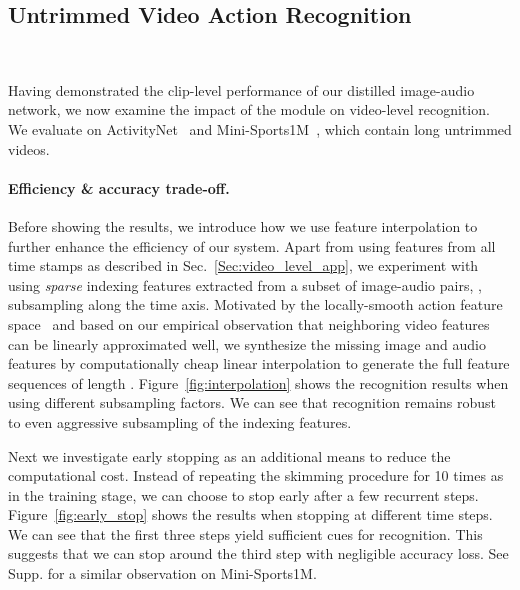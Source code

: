 \vspace{-0.05in}
\subsection{Untrimmed Video Action Recognition}~\label{Sec:video_level_results}
\vspace{-0.2in}

Having demonstrated the clip-level performance of our distilled image-audio network, we now examine the impact of the  module on video-level recognition. We evaluate on ActivityNet~\cite{caba2015activitynet} and Mini-Sports1M~\cite{karpathy2014large}, which contain long untrimmed videos. 

\vspace{-0.05in}
\paragraph{Efficiency \& accuracy trade-off.} 
Before showing the results, we introduce how we use feature interpolation to further enhance the efficiency of our system. Apart from using features from all  time stamps as described in Sec.~\ref{Sec:video_level_app}, we experiment with using \emph{sparse} indexing features extracted from a subset of image-audio pairs, \ie, subsampling along the time axis. Motivated by the locally-smooth action feature space~\cite{Dwibedi_2019_CVPR} and based on our empirical observation that neighboring video features can be linearly approximated well, we synthesize the missing image and audio features by computationally cheap linear interpolation to generate the full feature sequences of length . Figure~\ref{fig:interpolation} shows the recognition results when using different subsampling factors. We can see that recognition remains robust to even aggressive subsampling of the indexing features.

Next we investigate early stopping as an additional means to reduce the computational cost. Instead of repeating the skimming procedure for 10 times as in the training stage, we can choose to stop early after a few recurrent steps. Figure~\ref{fig:early_stop} shows the results when stopping at different time steps. We can see that the first three steps yield sufficient cues for recognition. This suggests that we can stop around the third step with negligible accuracy loss. See Supp. for a similar observation on Mini-Sports1M.

